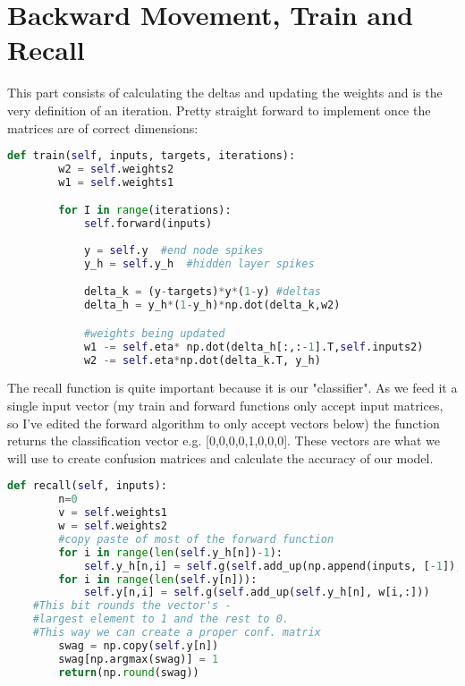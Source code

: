 \documentclass[10pt, a4paper]{article}
\begin{document}
\section{Backward Movement, Train and Recall}
This part consists of calculating the deltas and updating the weights and is the very definition of an iteration. 
Pretty straight forward to implement once the matrices are of correct dimensions:
\begin{lstlisting}[language = Python]
    def train(self, inputs, targets, iterations):
        w2 = self.weights2
        w1 = self.weights1

        for I in range(iterations):
            self.forward(inputs)
    
            y = self.y  #end node spikes
            y_h = self.y_h  #hidden layer spikes

            delta_k = (y-targets)*y*(1-y) #deltas
            delta_h = y_h*(1-y_h)*np.dot(delta_k,w2) 

            #weights being updated
            w1 -= self.eta* np.dot(delta_h[:,:-1].T,self.inputs2)
            w2 -= self.eta*np.dot(delta_k.T, y_h)
\end{lstlisting}
The recall function is quite important because it is our "classifier". As we feed it a single input vector (my train and forward functions only accept input matrices, so I've edited the forward algorithm to only accept vectors below)
the function returns the classification vector e.g. [0,0,0,0,1,0,0,0]. These vectors are what we will use to create confusion matrices and calculate the accuracy of our model.
\begin{lstlisting}[language = Python]
    def recall(self, inputs):
        n=0
        v = self.weights1
        w = self.weights2
        #copy paste of most of the forward function
        for i in range(len(self.y_h[n])-1):
            self.y_h[n,i] = self.g(self.add_up(np.append(inputs, [-1]),v[i,:]))
        for i in range(len(self.y[n])):
            self.y[n,i] = self.g(self.add_up(self.y_h[n], w[i,:]))
	#This bit rounds the vector's -
	#largest element to 1 and the rest to 0.
	#This way we can create a proper conf. matrix
        swag = np.copy(self.y[n])
        swag[np.argmax(swag)] = 1
        return(np.round(swag))
\end{lstlisting}
\end{document}
